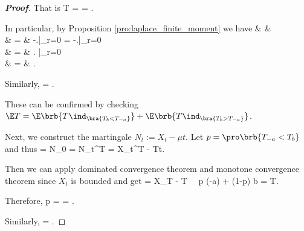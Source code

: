 \begin{proof}[\bf Proof]
That is
\be
\E T =  = .
\ee

In particular, by Proposition \ref{pro:laplace_finite_moment} %
we have
\beast
& & \E{} \\
& = &  -\left.\right|_{r=0} = -\left.\right|_{r=0}\\
& = & \left. \right|_{r=0} \\
& = & .
\eeast

Similarly,
\be
\E{} = .
\ee

These can be confirmed by checking $\E T = \E\brb{T \ind_{\bra{T_{b}<T_{-a}}}} + \E\brb{T \ind_{\bra{T_{b} > T_{-a}}}}$.

Next, we construct the martingale $N_t := X_t - \mu t$. Let $p=\pro\brb{T_{-a}<T_b}$ and thus
 = N_0 = \E N_t^T = \E X_t^T - \mu \E T\land t.
\ee

Then we can apply dominated convergence theorem and monotone convergence theorem since $X_t$ is bounded and get
 = \E X_T - \mu \E T \ \ra \ p (-a) + (1-p) b = \mu \E T.
\ee

Therefore,
\be
p =   = .
\ee

Similarly,
\be
\pro{} =  .
\ee
\end{proof}

